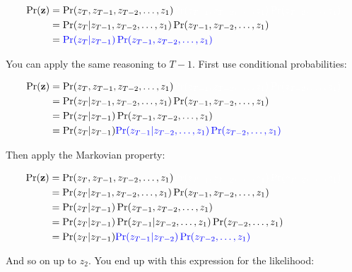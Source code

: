 \documentclass[
  12pt,
]{krantz}
\begin{document}
\begin{align*}
\Pr(\mathbf{z}) &= \Pr(z_T, z_{T-1}, z_{T-2}, \ldots, z_1) \color{white}{\Pr(z_{T-1}, z_{T-2},\ldots, z_1) \Pr(z_{T-2}, \ldots, z_1)}\\
                &= \Pr(z_T | z_{T-1}, z_{T-2},\ldots, z_1) \Pr(z_{T-1}, z_{T-2},\ldots, z_1) \\
                &= \color{blue}{\Pr(z_T | z_{T-1})} \Pr(z_{T-1}, z_{T-2},\ldots, z_1) \\
\end{align*}

You can apply the same reasoning to \(T-1\). First use conditional probabilities:

\begin{align*}
\Pr(\mathbf{z}) &= \Pr(z_T, z_{T-1}, z_{T-2}, \ldots, z_1) \color{white}{\Pr(z_{T-1}, z_{T-2},\ldots, z_1) \Pr(z_{T-2}, \ldots, z_1)}\\
                &= \Pr(z_T | z_{T-1}, z_{T-2},\ldots, z_1) \Pr(z_{T-1}, z_{T-2},\ldots, z_1) \\
                &= \Pr(z_T | z_{T-1}) \Pr(z_{T-1}, z_{T-2},\ldots, z_1) \\
                &= \Pr(z_T | z_{T-1}) \color{blue}{\Pr(z_{T-1} | z_{T-2}, \ldots, z_1) \Pr(z_{T-2}, \ldots, z_1)}\\
\end{align*}

Then apply the Markovian property:

\begin{align*}
\Pr(\mathbf{z}) &= \Pr(z_T, z_{T-1}, z_{T-2}, \ldots, z_1) \color{white}{\Pr(z_{T-1}, z_{T-2},\ldots, z_1) \Pr(z_{T-2}, \ldots, z_1)}\\
                &= \Pr(z_T | z_{T-1}, z_{T-2},\ldots, z_1) \Pr(z_{T-1}, z_{T-2},\ldots, z_1) \\
                &= \Pr(z_T | z_{T-1}) \Pr(z_{T-1}, z_{T-2},\ldots, z_1) \\
                &= \Pr(z_T | z_{T-1}) \Pr(z_{T-1} | z_{T-2}, \ldots, z_1) \Pr(z_{T-2}, \ldots, z_1)\\
                &= \Pr(z_T | z_{T-1}) \color{blue}{\Pr(z_{T-1} | z_{T-2})} \Pr(z_{T-2}, \ldots, z_1)\\
\end{align*}

And so on up to \(z_2\). You end up with this expression for the likelihood:
\end{document}
